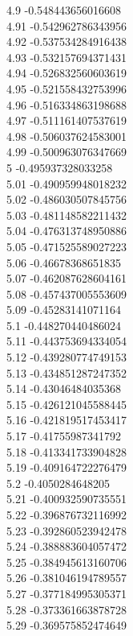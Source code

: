 {4.9	-0.548443656016608\\
4.91	-0.542962786343956\\
4.92	-0.537534284916438\\
4.93	-0.532157694371431\\
4.94	-0.526832560603619\\
4.95	-0.521558432753996\\
4.96	-0.516334863198688\\
4.97	-0.511161407537619\\
4.98	-0.506037624583001\\
4.99	-0.500963076347669\\
5	-0.495937328033258\\
5.01	-0.490959948018232\\
5.02	-0.486030507845756\\
5.03	-0.481148582211432\\
5.04	-0.476313748950886\\
5.05	-0.471525589027223\\
5.06	-0.46678368651835\\
5.07	-0.462087628604161\\
5.08	-0.457437005553609\\
5.09	-0.45283141071164\\
5.1	-0.448270440486024\\
5.11	-0.443753694334054\\
5.12	-0.439280774749153\\
5.13	-0.434851287247352\\
5.14	-0.43046484035368\\
5.15	-0.426121045588445\\
5.16	-0.421819517453417\\
5.17	-0.41755987341792\\
5.18	-0.413341733904828\\
5.19	-0.409164722276479\\
5.2	-0.4050284648205\\
5.21	-0.400932590735551\\
5.22	-0.396876732116992\\
5.23	-0.392860523942478\\
5.24	-0.388883604057472\\
5.25	-0.384945613160706\\
5.26	-0.381046194789557\\
5.27	-0.377184995305371\\
5.28	-0.373361663878728\\
5.29	-0.369575852474649\\
}
